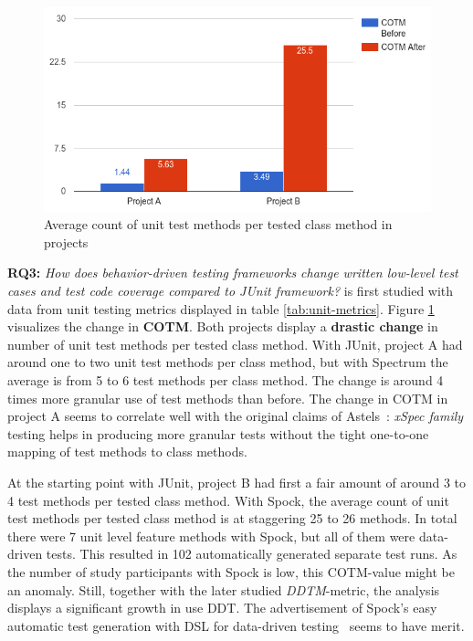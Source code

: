 \begin{figure}[ht]
  \begin{center}
    \includegraphics[width=12.7cm]{images/COTM.png}
    \caption{Average count of unit test methods per tested class method in projects}
    \label{fig:cotm}
  \end{center}
\end{figure}

\textbf{RQ3: }\textit{How does behavior-driven testing frameworks change written low-level test cases and test code coverage compared to JUnit framework?}
is first studied with data from unit testing metrics displayed in table \ref{tab:unit-metrics}. Figure \ref{fig:cotm} visualizes
the change in \textbf{COTM}. Both projects display a \textbf{drastic change} in number of unit test methods per tested class method. With JUnit, project A
had around one to two unit test methods per class method, but with Spectrum the average is from 5 to 6 test methods per class method. The
change is around 4 times more granular use of test methods than before. The change in COTM in project A seems to correlate well with the original
claims of Astels~\cite{astels2006new}: \textit{xSpec family} testing helps in producing more granular tests without the tight one-to-one mapping of test methods
to class methods.

At the starting point with JUnit, project B had first a fair amount of around 3 to 4
test methods per tested class method. With Spock, the average count of unit test methods per tested
class method is at staggering 25 to 26 methods. In total there were 7 unit level feature methods with Spock, but all of them were
data-driven tests. This resulted in 102 automatically generated separate test runs. As the number of study participants with Spock is low, this COTM-value might
be an anomaly. Still, together with the later studied \textit{DDTM}-metric, the analysis displays
a significant growth in use DDT. The advertisement of Spock's easy automatic test generation with DSL for data-driven testing~\cite{kapelonis2016java}
seems to have merit.

